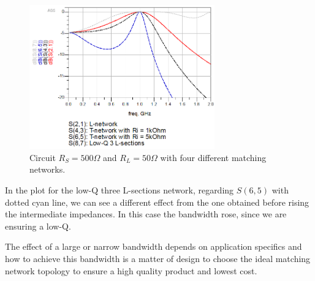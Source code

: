 \begin{figure}[H] 
\centering
\includegraphics[width=8cm]{images/BW3.PNG}
\caption{Circuit $R_S=500 \Omega$ and $R_L=50 \Omega$ with four different matching networks.}
\label{fig:bw3} 
\end{figure}

In the plot for the low-Q three L-sections network, regarding $S(6,5)$ with dotted cyan line, we can see a different effect from the one obtained before rising the intermediate impedances. In this case the bandwidth rose, since we are ensuring a low-Q.

The effect of a large or narrow bandwidth depends on application specifics and how to achieve this bandwidth is a matter of design to choose the ideal matching network topology to ensure a high quality product and lowest cost.
